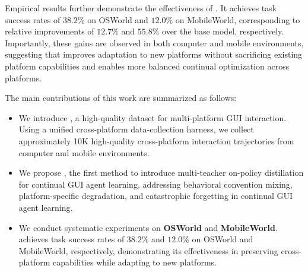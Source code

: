 Empirical results further demonstrate the effectiveness of \METHODNAME. It achieves
task success rates of $\mathbf{38.2\%}$ on OSWorld and $\mathbf{12.0\%}$ on MobileWorld, corresponding to
relative improvements of $\mathbf{12.7\%}$ and $\mathbf{55.8\%}$ over the base model, respectively.
Importantly, these gains are observed in both computer and mobile environments,
suggesting that \METHODNAME improves adaptation to new platforms without sacrificing
existing platform capabilities and enables more balanced continual
optimization across platforms.


The main contributions of this work are summarized as follows:

\begin{itemize}
    \item We introduce \BENCHhl, a high-quality dataset for multi-platform GUI interaction. Using a unified cross-platform data-collection harness, we collect approximately 10K high-quality cross-platform interaction trajectories from computer and mobile environments.

    \item We propose \METHODNAMEhl, the first method to introduce multi-teacher on-policy distillation for continual GUI agent learning, addressing behavioral convention mixing, platform-specific degradation, and catastrophic forgetting in continual GUI agent learning.

    \item We conduct systematic experiments on \textbf{OSWorld} and \textbf{MobileWorld}. \METHODNAMEhl achieves task success rates of $\mathbf{38.2\%}$ and $\mathbf{12.0\%}$ on OSWorld and MobileWorld, respectively, demonstrating its effectiveness in preserving cross-platform capabilities while adapting to new platforms.
\end{itemize}
